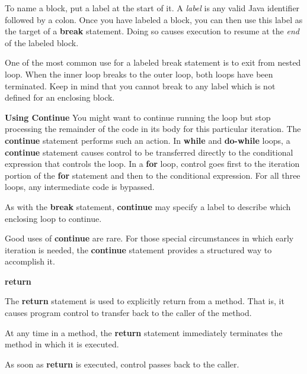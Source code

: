 \vskip 1mm
To name a block, put a label at the start of it. A {\it label} is any valid Java identifier followed by a colon. Once you have labeled a block, you can then use this label as the target of a {\bf break} statement. Doing so causes execution to resume at the {\it end} of the labeled block.

\vskip 1mm
One of the most common use for a labeled break statement is to exit from nested loop. When the inner loop breaks to the outer loop, both loops have been terminated. Keep in mind that you cannot break to any label which is not defined for an enclosing block.

\vskip 1in
\filbreak
{\bf Using Continue}
\vskip 3mm
You might want to continue running the loop but stop processing the remainder of the code in its body for this particular iteration. The {\bf continue} statement performs such an action. In {\bf while} and {\bf do-while} loops, a {\bf continue} statement causes control to be transferred directly to the conditional expression that controls the loop. In a {\bf for} loop, control goes first to the iteration portion of the {\bf for} statement and then to the conditional expression. For all three loops, any intermediate code is bypassed.

\vskip 1mm
As with the {\bf break} statement, {\bf continue} may specify a label to describe which enclosing loop to continue.

\vskip 1mm
Good uses of {\bf continue} are rare. For those special circumstances in which early iteration is needed, the {\bf continue} statement provides a structured way to accomplish it.

\vskip 1in
\filbreak
{\bf return}

\vskip 3mm
The {\bf return} statement is used to explicitly return from a method. That is, it causes program control to transfer back to the caller of the method.

\vskip 1mm
At any time in a method, the {\bf return} statement immediately terminates the method in which it is executed.

\vskip 1mm
As soon as {\bf return} is executed, control passes back to the caller.

\filbreak
\vfill\eject
\bye
